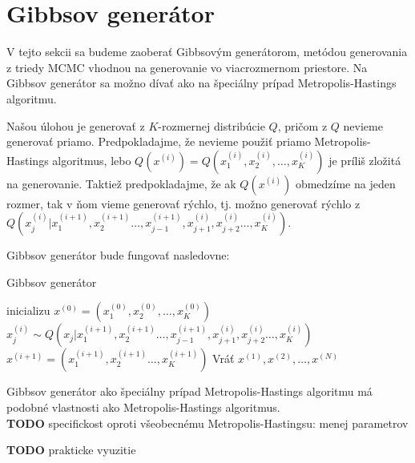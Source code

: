 \section{Gibbsov generátor}

V tejto sekcii sa budeme zaoberať Gibbsovým generátorom, metódou generovania z triedy MCMC vhodnou na generovanie vo viacrozmernom priestore. Na Gibbsov generátor sa možno dívať ako na špeciálny prípad Metropolis-Hastings algoritmu.

Našou úlohou je generovať z $K$-rozmernej distribúcie $Q$, pričom z $Q$ nevieme generovať priamo. Predpokladajme, že nevieme použiť priamo Metropolis-Hastings algoritmus, lebo $Q(x^{(i)})=Q(x^{(i)}_1, x^{(i)}_2, \dots, x^{(i)}_K)$ je príliš zložitá na generovanie. Taktiež predpokladajme, že ak $Q(x^{(i)})$ obmedzíme na jeden rozmer, tak v ňom vieme generovať rýchlo, tj. možno generovať rýchlo z $Q(x^{(i)}_j | x^{(i+1)}_1, x^{(i+1)}_2 \dots, x^{(i+1)}_{j-1}, x^{(i)}_{j+1}, x^{(i)}_{j+2} \dots, x^{(i)}_K)$.

Gibbsov generátor bude fungovať nasledovne:

\begin{algorithm}[H]
	\caption{Gibbsov generátor \cite{mcmc_intro_mackay}}
	\label{gibbs}
	\begin{algorithmic}[1]
		\State inicializu $x^{(0)} = (x^{(0)}_1, x^{(0)}_2, \dots, x^{(0)}_K)$
				\State $x^{(i)}_j \sim Q(x_j | x^{(i+1)}_1, x^{(i+1)}_2 \dots, x^{(i+1)}_{j-1}, x^{(i)}_{j+1}, x^{(i)}_{j+2} \dots, x^{(i)}_K)$
			\EndFor
			\State $x^{(i+1)}= (x^{(i+1)}_1, x^{(i+1)}_2 \dots, x^{(i+1)}_K)$
		\EndFor
		\State Vráť ${x^{(1)},x^{(2)},\dots,x^{(N)}}$
	\end{algorithmic}
\end{algorithm}

Gibbsov generátor ako špeciálny prípad Metropolis-Hastings algoritmu má podobné vlastnosti ako Metropolis-Hastings algoritmus.\\

\textbf{TODO} specifickost oproti všeobecnému Metropolis-Hastingsu: menej parametrov

\textbf{TODO} prakticke vyuzitie

